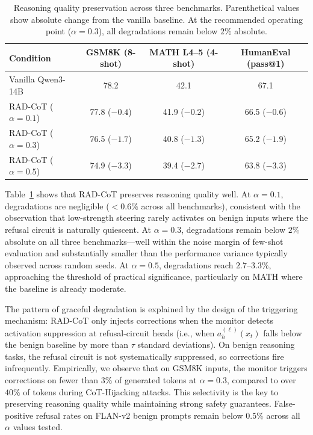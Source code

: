 \documentclass[11pt]{article}
\begin{document}
\begin{table}[t]
\centering
\caption{Reasoning quality preservation across three benchmarks. Parenthetical values show absolute change from the vanilla baseline. At the recommended operating point ($\alpha{=}0.3$), all degradations remain below $2\%$ absolute.}
\label{tab:reasoning}
\begin{tabular}{lccc}
\toprule
\textbf{Condition} & \textbf{GSM8K (8-shot)} & \textbf{MATH L4--5 (4-shot)} & \textbf{HumanEval (pass@1)} \\
\midrule
Vanilla Qwen3-14B & 78.2 & 42.1 & 67.1 \\
RAD-CoT ($\alpha{=}0.1$) & 77.8 \small{($-0.4$)} & 41.9 \small{($-0.2$)} & 66.5 \small{($-0.6$)} \\
RAD-CoT ($\alpha{=}0.3$) & 76.5 \small{($-1.7$)} & 40.8 \small{($-1.3$)} & 65.2 \small{($-1.9$)} \\
RAD-CoT ($\alpha{=}0.5$) & 74.9 \small{($-3.3$)} & 39.4 \small{($-2.7$)} & 63.8 \small{($-3.3$)} \\
\bottomrule
\end{tabular}
\end{table}

Table~\ref{tab:reasoning} shows that RAD-CoT preserves reasoning quality well. At $\alpha{=}0.1$, degradations are negligible ($< 0.6\%$ across all benchmarks), consistent with the observation that low-strength steering rarely activates on benign inputs where the refusal circuit is naturally quiescent. At $\alpha{=}0.3$, degradations remain below $2\%$ absolute on all three benchmarks---well within the noise margin of few-shot evaluation and substantially smaller than the performance variance typically observed across random seeds. At $\alpha{=}0.5$, degradations reach $2.7$--$3.3\%$, approaching the threshold of practical significance, particularly on MATH where the baseline is already moderate.

The pattern of graceful degradation is explained by the design of the triggering mechanism: RAD-CoT only injects corrections when the monitor detects activation suppression at refusal-circuit heads (i.e., when $a_h^{(\ell)}(x_t)$ falls below the benign baseline by more than $\tau$ standard deviations). On benign reasoning tasks, the refusal circuit is not systematically suppressed, so corrections fire infrequently. Empirically, we observe that on GSM8K inputs, the monitor triggers corrections on fewer than $3\%$ of generated tokens at $\alpha{=}0.3$, compared to over $40\%$ of tokens during CoT-Hijacking attacks. This selectivity is the key to preserving reasoning quality while maintaining strong safety guarantees. False-positive refusal rates on FLAN-v2 benign prompts remain below $0.5\%$ across all $\alpha$ values tested.
\end{document}

